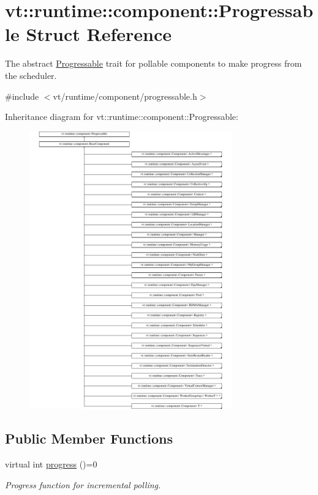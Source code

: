 \hypertarget{structvt_1_1runtime_1_1component_1_1_progressable}{}\section{vt\+:\+:runtime\+:\+:component\+:\+:Progressable Struct Reference}
\label{structvt_1_1runtime_1_1component_1_1_progressable}


The abstract {\ttfamily \hyperlink{structvt_1_1runtime_1_1component_1_1_progressable}{Progressable}} trait for pollable components to make progress from the scheduler.  




{\ttfamily \#include $<$vt/runtime/component/progressable.\+h$>$}

Inheritance diagram for vt\+:\+:runtime\+:\+:component\+:\+:Progressable\+:\begin{figure}[H]
\begin{center}
\leavevmode
\includegraphics[height=12.000000cm]{structvt_1_1runtime_1_1component_1_1_progressable}
\end{center}
\end{figure}
\subsection*{Public Member Functions}
\begin{DoxyCompactItemize}
\item 
virtual int \hyperlink{structvt_1_1runtime_1_1component_1_1_progressable_a37e883d4822db4f1effa9587b9f1160d}{progress} ()=0
\begin{DoxyCompactList}\small\item\em Progress function for incremental polling. \end{DoxyCompactList}\end{DoxyCompactItemize}


